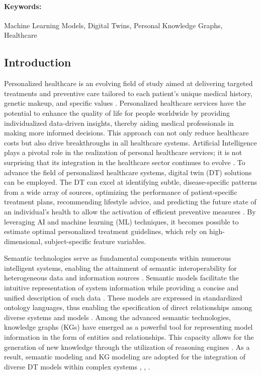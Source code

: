 \paragraph{Keywords:} Machine Learning Models, Digital Twins, Personal Knowledge Graphs, Healthcare

\subsection{Introduction}\label{sec:paper4_introduction}

Personalized healthcare is an evolving field of study aimed at delivering targeted treatments and preventive care tailored to each patient's unique medical history, genetic makeup, and specific values \cite{johnson_precision_2021}. Personalized healthcare services have the potential to enhance the quality of life for people worldwide by providing individualized data-driven insights, thereby aiding medical professionals in making more informed decisions. This approach can not only reduce healthcare costs but also drive breakthroughs in all healthcare systems. Artificial Intelligence plays a pivotal role in the realization of personal healthcare services; it is not surprising that its integration in the healthcare sector continues to evolve \cite{sun_review_2022}. To advance the field of personalized healthcare systems, digital twin (DT) solutions can be employed. The DT can excel at identifying subtle, disease-specific patterns from a wide array of sources, optimizing the performance of patient-specific treatment plans, recommending lifestyle advice, and predicting the future state of an individual's health to allow the activation of efficient preventive measures \cite{hassani_impactful_2022}. By leveraging AI and machine learning (ML) techniques, it becomes possible to estimate optimal personalized treatment guidelines, which rely on high-dimensional, subject-specific feature variables.

Semantic technologies serve as fundamental components within numerous intelligent systems, enabling the attainment of semantic interoperability for heterogeneous data and information sources \cite{sadeghi_interoperability_2023}. Semantic models facilitate the intuitive representation of system information while providing a concise and unified description of such data \cite{delgoshaei_semantic_2022}. These models are expressed in standardized ontology languages, thus enabling the specification of direct relationships among diverse systems and models \cite{lan_semantic_2022}. Among the advanced semantic technologies, knowledge graphs (KGs) have emerged as a powerful tool for representing model information in the form of entities and relationships. This capacity allows for the generation of new knowledge through the utilization of reasoning engines \cite{ren_smore_2022}. As a result, semantic modeling and KG modeling are adopted for the integration of diverse DT models within complex systems \cite{raj_building_2023}, \cite{ploennigs_scaling_2022}, \cite{jia_simple_2022}. 

